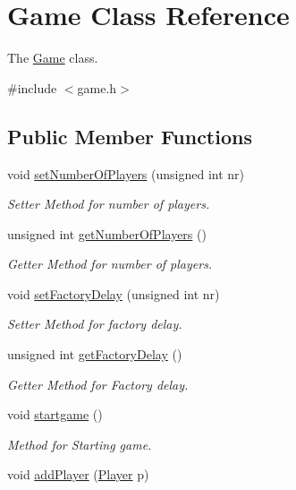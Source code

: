 \hypertarget{classGame}{}\section{Game Class Reference}
\label{classGame}


The \hyperlink{classGame}{Game} class.  




{\ttfamily \#include $<$game.\+h$>$}

\subsection*{Public Member Functions}
\begin{DoxyCompactItemize}
\item 
void \hyperlink{classGame_ab3646e6404630076f38d56c1ed36537a}{set\+Number\+Of\+Players} (unsigned int nr)
\begin{DoxyCompactList}\small\item\em Setter Method for number of players. \end{DoxyCompactList}\item 
unsigned int \hyperlink{classGame_a6118afd4e0300b2e855e42fb8400411c}{get\+Number\+Of\+Players} ()
\begin{DoxyCompactList}\small\item\em Getter Method for number of players. \end{DoxyCompactList}\item 
void \hyperlink{classGame_a6b53474fddd090df8ee7eb00512fccb6}{set\+Factory\+Delay} (unsigned int nr)
\begin{DoxyCompactList}\small\item\em Setter Method for factory delay. \end{DoxyCompactList}\item 
unsigned int \hyperlink{classGame_a924b77b7e4e073da9fd634e5200c8358}{get\+Factory\+Delay} ()
\begin{DoxyCompactList}\small\item\em Getter Method for Factory delay. \end{DoxyCompactList}\item 
void \hyperlink{classGame_a5cb92fa59d3d5e06c1b8f4349308b315}{startgame} ()
\begin{DoxyCompactList}\small\item\em Method for Starting game. \end{DoxyCompactList}\item 
void \hyperlink{classGame_a8d55289a3b6f78014ac06f2faa0a7335}{add\+Player} (\hyperlink{classPlayer}{Player} p)

\end{DoxyCompactItemize}
